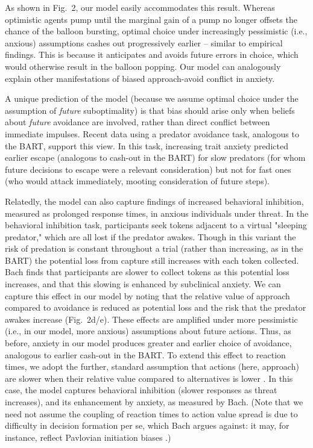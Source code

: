 \documentclass[11pt]{article} %
\begin{document}
As shown in Fig.~2, our model easily accommodates this result. Whereas optimistic agents pump until the marginal gain of a pump no longer offsets the chance of the balloon bursting, optimal choice under increasingly pessimistic (i.e., anxious) assumptions cashes out progressively earlier -- similar to empirical findings\citep{Maner2007, ramirez2015}. This is because it anticipates and avoids future errors in choice, which would otherwise result in the balloon popping. Our model can analogously explain other manifestations of biased approach-avoid conflict in anxiety\cite{fung2019}. 

A unique prediction of the model (because we assume optimal choice under the assumption of \emph{future} suboptimality) is that bias should arise only when beliefs about \emph{future} avoidance are involved, rather than direct conflict between immediate impulses. Recent data \cite{fung2019} using a predator avoidance task, analogous to the BART, support this view. In this task, increasing trait anxiety predicted earlier escape (analogous to cash-out in the BART) for slow predators (for whom future decisions to escape were a relevant consideration) but not for fast ones (who would attack immediately, mooting consideration of future steps). 

Relatedly, the model can also capture findings of increased behavioral inhibition, measured as prolonged response times, in anxious individuals under threat\cite{bach2015}. In the behavioral inhibition task, participants seek tokens adjacent to a virtual "sleeping predator," which are all lost if the predator awakes. Though in this variant the risk of predation is constant throughout a trial (rather than increasing, as in the BART) the potential loss from capture still increases with each token collected. Bach \cite{bach2015} finds that participants are slower to collect tokens as this potential loss increases, and that this slowing is enhanced by subclinical anxiety. We can capture this effect in our model by noting that the relative value of approach compared to avoidance is reduced as potential loss and the risk that the predator awakes increase (Fig.~2d/e). These effects are amplified under more pessimistic (i.e., in our model, more anxious) assumptions about future actions. Thus, as before, anxiety in our model produces greater and earlier choice of avoidance, analogous to earlier cash-out in the BART. To extend this effect to reaction times, we adopt the further, standard assumption that actions (here, approach) are slower when their relative value compared to alternatives is lower \citep{oud2016}. In this case, the model captures behavioral inhibition (slower responses as threat increases), and its enhancement by anxiety, as measured by Bach. (Note that we need not assume the coupling of reaction times to action value spread is due to difficulty in decision formation per se, which Bach argues against: it may, for instance, reflect Pavlovian initiation biases \cite{niv2007}.)
\end{document}
